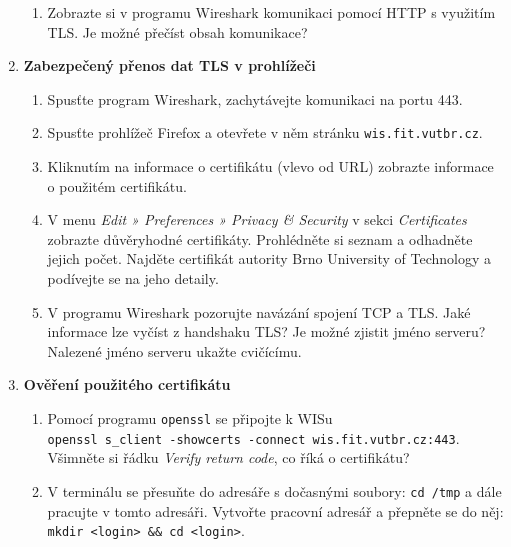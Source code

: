 \documentclass[a4paper,11pt]{article}
\begin{document}
\begin{enumerate}
\begin{enumerate}
      \item Zobrazte si v programu Wireshark komunikaci pomocí HTTP s využitím
        TLS. Je možné přečíst obsah komunikace?

    \end{enumerate}

  \item {\bf Zabezpečený přenos dat TLS v prohlížeči}

    \begin{enumerate}

      \item Spusťte program Wireshark, zachytávejte komunikaci na portu 443.

      \item Spusťte prohlížeč Firefox a otevřete v něm stránku
        \verb|wis.fit.vutbr.cz|.

      \item Kliknutím na informace o certifikátu (vlevo od URL) zobrazte
        informace o použitém certifikátu.

      \item V menu \emph{Edit » Preferences » Privacy \& Security} v sekci
        \emph{Certificates} zobrazte důvěryhodné certifikáty. Prohlédněte si
        seznam a odhadněte jejich počet. Najděte certifikát autority Brno
        University of Technology a podívejte se na jeho detaily.

      \item V programu Wireshark pozorujte navázání spojení TCP a TLS. Jaké
        informace lze vyčíst z handshaku TLS? Je možné zjistit jméno serveru?
        Nalezené jméno serveru ukažte cvičícímu.

    \end{enumerate}

  \item {\bf Ověření použitého certifikátu}

    \begin{enumerate}

      \item Pomocí programu {\tt openssl} se připojte k WISu \\
        \verb|openssl s_client -showcerts -connect wis.fit.vutbr.cz:443|. \\
        Všimněte si řádku \emph{Verify return code}, co
        říká o certifikátu?

      \item V terminálu se přesuňte do adresáře s dočasnými soubory:
        \verb|cd /tmp| a dále pracujte v tomto adresáři. Vytvořte pracovní
        adresář a přepněte se do něj: \verb|mkdir <login> && cd <login>|.


\end{enumerate}
\end{enumerate}
\end{document}
